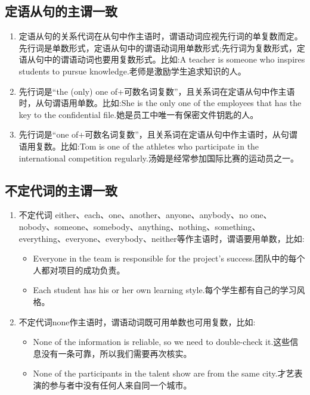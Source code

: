 \subsection{定语从句的主谓一致}

\begin{enumerate}
  \item 定语从句的关系代词在从句中作主语时，谓语动词应视先行词的单复数而定。先行词是单数形式，定语从句中的谓语动词用单数形式;先行词为复数形式，定语从句中的谓语动词也要用复数形式。比如:A teacher is someone who inspires students to pursue knowledge.老师是激励学生追求知识的人。
  \item 先行词是“the (only) one of+可数名词复数”，且关系词在定语从句中作主语时，从句谓语用单数。比如:She is the only one of the employees that has the key to the confidential file.她是员工中唯一有保密文件钥匙的人。
  \item 先行词是“one of+可数名词复数”，且关系词在定语从句中作主语时，从句谓语用复数。比如:Tom is one of the athletes who participate in the international competition regularly.汤姆是经常参加国际比赛的运动员之一。
\end{enumerate}

\subsection{不定代词的主谓一致}

\begin{enumerate}
  \item 不定代词 either、each、one、another、anyone、anybody、no one、nobody、someone、somebody、anything、nothing、something、everything、everyone、everybody、neither等作主语时，谓语要用单数，比如:
        \begin{itemize}
          \item Everyone in the team is responsible for the project's success.团队中的每个人都对项目的成功负责。
          \item Each student has his or her own learning style.每个学生都有自己的学习风格。
        \end{itemize}
  \item 不定代词none作主语时，谓语动词既可用单数也可用复数，比如:
        \begin{itemize}
          \item None of the information is reliable, so we need to double-check it.这些信息没有一条可靠，所以我们需要再次核实。
          \item None of the participants in the talent show are from the same city.才艺表演的参与者中没有任何人来自同一个城市。
        \end{itemize}
\end{enumerate}

